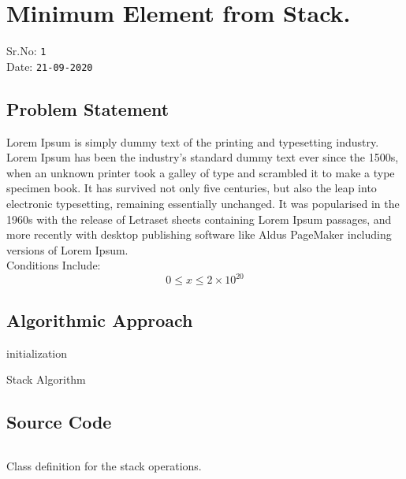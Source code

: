\documentclass[12pt,a4paper]{article}
\begin{document}
\newpage
\renewcommand\listoflistingscaption{List of source codes}
\listoflistings

\newpage
\renewcommand\listoflistingscaption{List of Algorithms}
\listofalgorithms


\newpage
\section{Minimum Element from Stack.}
\begin{flushleft}
Sr.No: \texttt{1}\\
\vspace{10px}
Date: \texttt{21-09-2020}\\
\subsection{Problem Statement}
Lorem Ipsum is simply dummy text of the printing and typesetting industry. Lorem Ipsum has been the industry's standard dummy text ever since the 1500s, when an unknown printer took a galley of type and scrambled it to make a type specimen book. It has survived not only five centuries, but also the leap into electronic typesetting, remaining essentially unchanged. It was popularised in the 1960s with the release of Letraset sheets containing Lorem Ipsum passages, and more recently with desktop publishing software like Aldus PageMaker including versions of Lorem Ipsum.\\
\vspace{15px}
Conditions Include:\\

$$0 \leq x \le 2\times10^{20}$$

\subsection{Algorithmic Approach}
\begin{algorithm}[H]
\SetAlgoLined
{}
 initialization\;
 \caption{Stack Algorithm}
\end{algorithm}
\subsection{Source Code}
\begin{listing}[H]
\inputminted[tabsize=2,breaklines]{python}{code_1.py}
\caption{Class definition for the stack operations.}
\label{Code:1}
\end{listing}

\end{flushleft}
\end{document}
